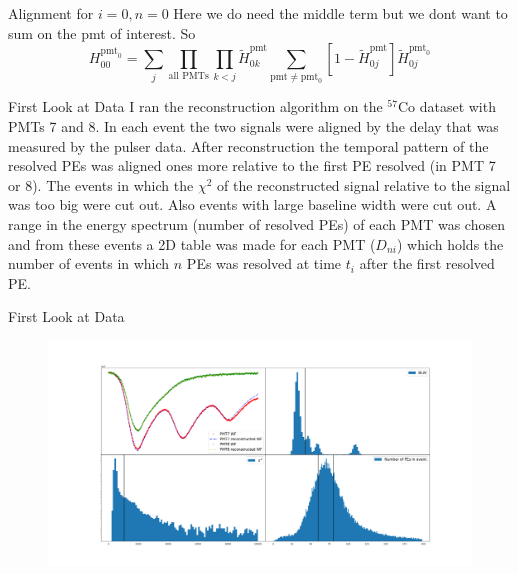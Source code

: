 \documentclass{beamer}
\begin{document}
\begin{frame}{Alignment for $i=0, n=0$}
Here we do need the middle term but we dont want to sum on the pmt of interest. So
\begin{equation}
H_{00}^{\text{pmt}_0}=\sum_j\prod_{\text{all PMTs}}\prod_{k<j}\tilde{H}_{0k}^{\text{pmt}}\sum_{\text{pmt}\neq\text{pmt}_0}[1-\tilde{H}_{0j}^{\text{pmt}}]\tilde{H}_{0j}^{\text{pmt}_0}
\end{equation}
\end{frame}

\begin{frame}{First Look at Data}
I ran the reconstruction algorithm on the $^{57}$Co dataset with PMTs 7 and 8. In each event the two signals were aligned by the delay that was measured by the pulser data. After reconstruction the temporal pattern of the resolved PEs was aligned ones more relative to the first PE resolved (in PMT 7 or 8). The events in which the $\chi^2$ of the reconstructed signal relative to the signal was too big were cut out. Also events with large baseline width were cut out. A range in the energy spectrum (number of resolved PEs) of each PMT was chosen and from these events a 2D table was made for each PMT ($D_{ni}$) which holds the number of events in which $n$ PEs was resolved at time $t_i$ after the first resolved PE.
\end{frame}

\begin{frame}{First Look at Data}
\begin{figure}[h]
\includegraphics[width=1\textwidth]{data_event.png}
\end{figure}
\end{frame}
\end{document}
